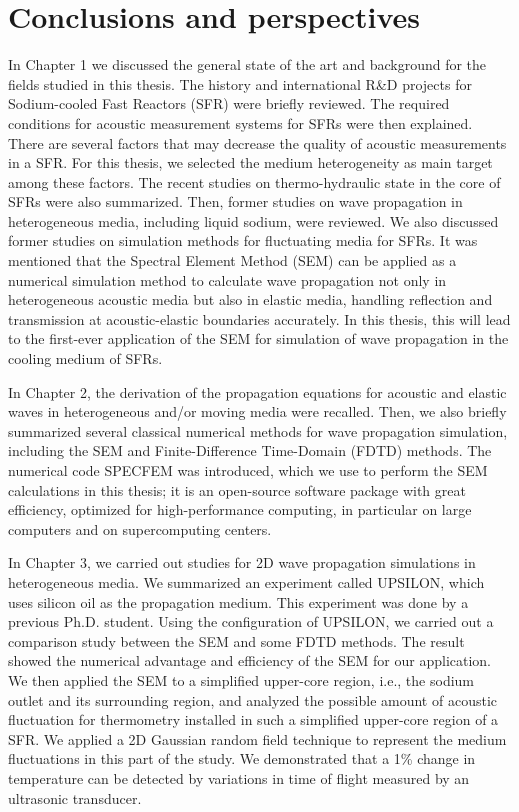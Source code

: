 
\chapter{Conclusions and perspectives}
\label{chap:5}

In Chapter 1 we discussed the general state of the art and background for the fields studied in this thesis.
The history and international R\&D projects for Sodium-cooled Fast Reactors (SFR) were briefly reviewed.
The required conditions for acoustic measurement systems for SFRs were then explained.
There are several factors that may decrease the quality of acoustic measurements in a SFR.
For this thesis, we selected the medium heterogeneity as main target among these factors.
The recent studies on thermo-hydraulic state in the core of SFRs were also summarized.
Then, former studies on wave propagation in heterogeneous media, including liquid sodium, were reviewed.
We also discussed former studies on simulation methods for fluctuating media for SFRs.
It was mentioned that the Spectral Element Method (SEM) can be applied as a numerical simulation method
to calculate wave propagation not only in heterogeneous acoustic media but also in elastic media, handling reflection and transmission at acoustic-elastic boundaries accurately.
In this thesis, this will lead to the first-ever application of the SEM for simulation of wave propagation in the cooling medium of SFRs.

In Chapter 2, the derivation of the propagation equations for acoustic and elastic waves in heterogeneous and/or moving media were recalled.
Then, we also briefly summarized several classical numerical methods for wave propagation simulation, including the SEM and Finite-Difference Time-Domain (FDTD) methods.
The numerical code SPECFEM was introduced, which we use to perform the SEM calculations in this thesis; it is an open-source software package with great efficiency,
optimized for high-performance computing, in particular on large computers and on supercomputing centers.

In Chapter 3, we carried out studies for 2D wave propagation simulations in heterogeneous media.
We summarized an experiment called UPSILON, which uses silicon oil as the propagation medium.
This experiment was done by a previous Ph.D. student.
Using the configuration of UPSILON, we carried out a comparison study between the SEM and some FDTD methods.
The result showed the numerical advantage and efficiency of the SEM for our application.
We then applied the SEM to a simplified upper-core region, i.e., the sodium outlet and its surrounding region,
and analyzed the possible amount of acoustic fluctuation for thermometry installed in such a simplified upper-core region of a SFR.
We applied a 2D Gaussian random field technique to represent the medium fluctuations in this part of the study.
We demonstrated that a \num{1}\% change in temperature can be detected by variations in time of flight measured by an ultrasonic transducer.

